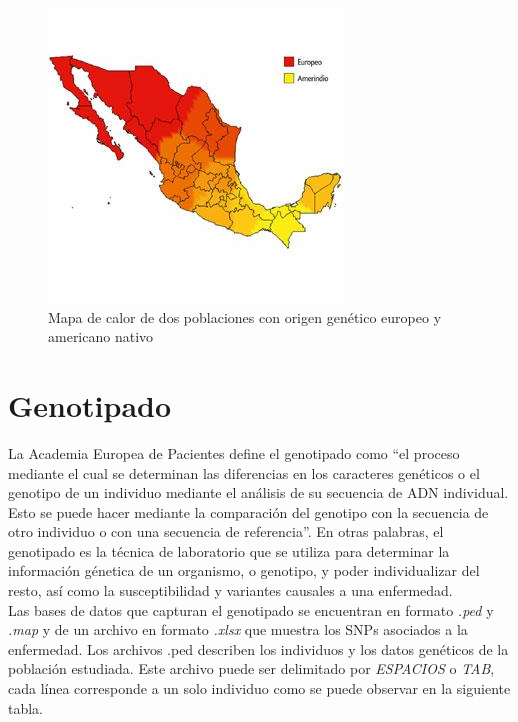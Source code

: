 \begin{figure}[H]
  \centering
  \includegraphics[scale=0.7]{calor_indi.jpg}
  \caption[Mapa de calor de dos poblaciones (europeo y americano nativo)]{Mapa de calor de dos poblaciones con origen gen\'etico europeo y americano nativo \cite{Gabriela}}
  \label{fig:calor}
\end{figure}

\section{Genotipado}\label{sub:geno}

La Academia Europea de Pacientes \cite{ACP} define el genotipado como ``el proceso mediante el cual se determinan las diferencias en los caracteres genéticos o el genotipo de un individuo mediante el análisis de su secuencia de ADN individual. Esto se puede hacer mediante la comparación del genotipo con la secuencia de otro individuo o con una secuencia de referencia''. En otras palabras, el genotipado es la t\'ecnica de laboratorio que se utiliza para determinar la informaci\'on g\'enetica de un organismo, o genotipo, y poder individualizar del resto, as\'i como la susceptibilidad y variantes causales a una enfermedad.\\


Las bases de datos que capturan el genotipado se encuentran en formato \textit{.ped} y \textit{.map} y de un archivo en formato \textit{.xlsx} que muestra los SNPs asociados a la enfermedad. Los archivos .ped describen los individuos y los datos gen\'eticos de la poblaci\'on estudiada. Este archivo puede ser delimitado por \textit{ESPACIOS} o \textit{TAB}, cada l\'inea corresponde a un solo individuo como se puede observar en la siguiente tabla.\\

